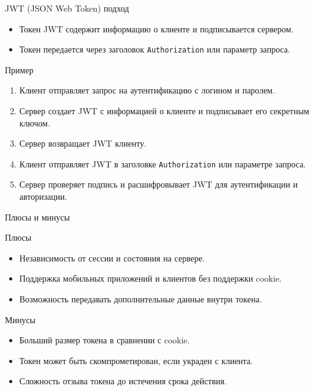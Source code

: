 \documentclass[
  ignorenonframetext,
  aspectratio=169,
  aspectratio=169]{beamer}
\newcommand{\passthrough}[1]{#1}
\providecommand{\tightlist}{%
  \setlength{\itemsep}{0pt}\setlength{\parskip}{0pt}}
\begin{document}
\begin{frame}[fragile]{JWT (JSON Web Token) подход}
\protect\hypertarget{jwt-json-web-token-ux43fux43eux434ux445ux43eux434}{}
\begin{itemize}
\tightlist
\item
  Токен JWT содержит информацию о клиенте и подписывается сервером.
\item
  Токен передается через заголовок
  \passthrough{\lstinline!Authorization!} или параметр запроса.
\end{itemize}

\begin{block}{Пример}
\protect\hypertarget{ux43fux440ux438ux43cux435ux440-1}{}
\begin{enumerate}
\tightlist
\item
  Клиент отправляет запрос на аутентификацию с логином и паролем.
\item
  Сервер создает JWT с информацией о клиенте и подписывает его секретным
  ключом.
\item
  Сервер возвращает JWT клиенту.
\item
  Клиент отправляет JWT в заголовке
  \passthrough{\lstinline!Authorization!} или параметре запроса.
\item
  Сервер проверяет подпись и расшифровывает JWT для аутентификации и
  авторизации.
\end{enumerate}
\end{block}

\begin{block}{Плюсы и минусы}
\protect\hypertarget{ux43fux43bux44eux441ux44b-ux438-ux43cux438ux43dux443ux441ux44b-1}{}
\begin{block}{Плюсы}
\protect\hypertarget{ux43fux43bux44eux441ux44b-1}{}
\begin{itemize}
\tightlist
\item
  Независимость от сессии и состояния на сервере.
\item
  Поддержка мобильных приложений и клиентов без поддержки cookie.
\item
  Возможность передавать дополнительные данные внутри токена.
\end{itemize}
\end{block}

\begin{block}{Минусы}
\protect\hypertarget{ux43cux438ux43dux443ux441ux44b-1}{}
\begin{itemize}
\tightlist
\item
  Больший размер токена в сравнении с cookie.
\item
  Токен может быть скомпрометирован, если украден с клиента.
\item
  Сложность отзыва токена до истечения срока действия.
\end{itemize}


\end{block}
\end{block}
\end{frame}
\end{document}
